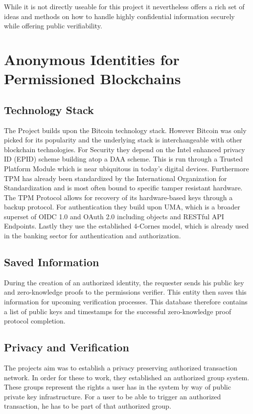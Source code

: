 While it is not directly useable for this project it nevertheless offers a rich set of ideas and methods on how to handle highly confidential information securely while offering public verifiability.

\section{Anonymous Identities for Permissioned Blockchains}

\subsection{Technology Stack}
The Project builds upon the Bitcoin technology stack. However Bitcoin was only picked for its popularity and the underlying stack is interchangeable with other blockchain technologies.\cite[p.2]{hardjono2016anonymous} For Security they depend on the Intel enhanced privacy ID (EPID) scheme building atop a DAA scheme. This is run through a Trusted Platform Module which is near ubiquitous in today's digital devices. Furthermore TPM has already been standardized by the International Organization for Standardization and is most often bound to specific tamper resistant hardware. The TPM Protocol allows for recovery of its hardware-based keys through a backup protocol.\cite[p.2-3]{hardjono2016anonymous}
For authentication they build upon UMA, which is a broader superset of OIDC 1.0 and OAuth 2.0 including objects and RESTful API Endpoints.\cite[p.13-14]{hardjono2016anonymous}
Lastly they use the established 4-Cornes model, which is already used in the banking sector for authentication and authorization.\cite[p.13]{hardjono2016anonymous}

\subsection{Saved Information}
During the creation of an authorized identity, the requester sends his public key and zero-knowledge proofs to the permissions verifier. This entity then saves this information for upcoming verification processes. This database therefore contains a list of public keys and timestamps for the successful zero-knowledge proof protocol completion.\cite[p.5]{hardjono2016anonymous}

\subsection{Privacy and Verification}
The projects aim was to establish a privacy preserving authorized transaction network. In order for these to work, they established an authorized group system. These groups represent the rights a user has in the system by way of public private key infrastructure. For a user to be able to trigger an authorized transaction, he has to be part of that authorized group.

